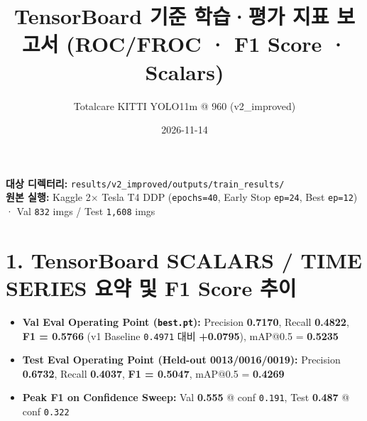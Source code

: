 \documentclass[10pt,a4paper]{article}
\title{\textbf{TensorBoard 기준 학습·평가 지표 보고서 (ROC/FROC · F1 Score · Scalars)}}
\author{Totalcare KITTI YOLO11m @ 960 (v2\_improved)}
\date{2026-11-14}
\begin{document}
\maketitle
\vspace{-8mm}

\noindent\textbf{대상 디렉터리:} \texttt{results/v2\_improved/outputs/train\_results/} \\
\textbf{원본 실행:} Kaggle 2$\times$ Tesla T4 DDP (\texttt{epochs=40}, Early Stop \texttt{ep=24}, Best \texttt{ep=12}) · Val \texttt{832} imgs / Test \texttt{1,608} imgs

\section*{1. TensorBoard SCALARS / TIME SERIES 요약 및 F1 Score 추이}
\begin{itemize}
  \item \textbf{Val Eval Operating Point (\texttt{best.pt}):} Precision \textbf{0.7170}, Recall \textbf{0.4822}, \textbf{F1 = 0.5766} (v1 Baseline \texttt{0.4971} 대비 \textbf{+0.0795}), mAP@0.5 = \textbf{0.5235}
  \item \textbf{Test Eval Operating Point (Held-out 0013/0016/0019):} Precision \textbf{0.6732}, Recall \textbf{0.4037}, \textbf{F1 = 0.5047}, mAP@0.5 = \textbf{0.4269}
  \item \textbf{Peak F1 on Confidence Sweep:} Val \textbf{0.555} @ conf \texttt{0.191}, Test \textbf{0.487} @ conf \texttt{0.322}
\end{itemize}
\end{document}
